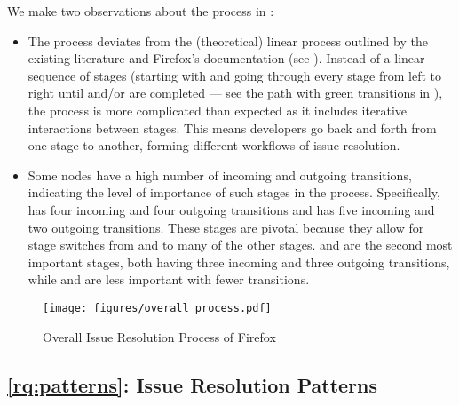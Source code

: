 We make two observations about the process in :
\begin{itemize}[itemindent=0cm,leftmargin=0.3cm]
	\item The process deviates from the (theoretical) linear process outlined by the existing literature and Firefox's documentation (see ). Instead of a linear sequence of stages (starting with \irs and going through every stage from left to right until \ver and/or \crv are completed --- see the path with green transitions in ), the process is more complicated than expected as it includes iterative interactions between stages. This means developers go back and forth from one stage to another, forming different workflows of issue resolution.
	\item Some nodes have a high number of incoming and outgoing transitions, indicating the level of importance of such stages in the process. Specifically, \sd has four incoming and four outgoing transitions and \impl has five incoming and two outgoing transitions. These stages are pivotal because they allow for stage switches from and to many of the other stages. \crv and \ver are the second most important stages, both having three incoming and three outgoing transitions, while \ia and \ir are less important with fewer transitions.
\end{itemize}





\begin{figure}[t]
	\centering
	\texttt{[image: figures/overall\_process.pdf]}
	\caption{Overall Issue Resolution Process of Firefox}
	\label{fig:overall_process}
\end{figure}

\subsection{\ref{rq:patterns}: Issue Resolution Patterns}
\label{sub:results_patterns}




